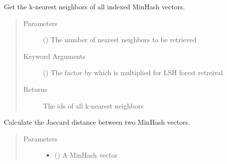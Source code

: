 \documentclass[letterpaper,10pt,english]{sphinxmanual}
\begin{document}
\begin{fulllineitems}
\begin{fulllineitems}
\end{fulllineitems}


\begin{fulllineitems}
\label{\detokenize{documentation:tmap.LSHForest.get_all_nearest_neighbors}}
Get the k-nearest neighbors of all indexed MinHash vectors.
\begin{quote}\begin{description}
\item[{Parameters}] \leavevmode
{} () \textendash{} The number of nearest neighbors to be retrieved

\item[{Keyword Arguments}] \leavevmode
{} () \textendash{} The factor by which  is multiplied for LSH forest retreival

\item[{Returns}] \leavevmode
{} The ids of all k-nearest neighbors

\end{description}\end{quote}

\end{fulllineitems}


\begin{fulllineitems}
\label{\detokenize{documentation:tmap.LSHForest.get_distance}}
Calculate the Jaccard distance between two MinHash vectors.
\begin{quote}\begin{description}
\item[{Parameters}] \leavevmode\begin{itemize}
\item {} 
 () \textendash{} A MinHash vector


\end{itemize}
\end{description}
\end{quote}
\end{fulllineitems}
\end{fulllineitems}
\end{document}
